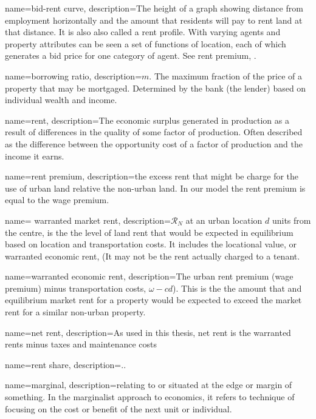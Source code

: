 {
name=bid-rent curve,
description={The height of a graph showing distance from employment horizontally and the amount that residents will pay to rent land at that distance. It is also also called a \gls{rent profile}. With varying agents and property attributes can be seen a set of functions of location, each of which  generates a bid price for one category of agent.   See \gls{rent premium}, .}
}

{
name=borrowing ratio,
description={$m$. The maximum fraction of the price of a property that may be mortgaged. Determined by the bank (the lender) based on individual wealth and income. }
}

{
name=rent,
description={The economic  surplus generated in production as a result of differences in the quality of some factor of production. Often described as the difference between the opportunity cost of a factor of production and the income it earns. }
}

{
name=rent premium,
description={the excess rent  that might be charge for the use of urban land relative the non-urban land. In our model the rent premium is equal to the wage premium. }
}

{
name= warranted market rent,
description={$\mathcal{R}_N$ at an  urban location  $d$ units from the centre, is the the level of land rent that would be expected in equilibrium based on location and transportation costs. It includes the locational value, or \gls{warranted economic rent}, (It may not be the rent actually charged to a tenant. }
}

{
name=warranted economic rent,
description={The urban rent premium (wage premium) minus transportation costs, $\omega-{c} d$). This is the the amount that and equilibrium market rent for a property would be expected to exceed the market rent for a similar non-urban property.}
}

{
name=net rent,
description={As used in this thesis, net rent is the warranted rents minus taxes and maintenance costs }
}

{
name=rent share,
description={..}
}



{
name=marginal,
description={relating to or situated at the edge or margin of something. In the marginalist approach to economics, it  refers to technique of focusing on the cost or benefit of the next unit or individual.}
}

